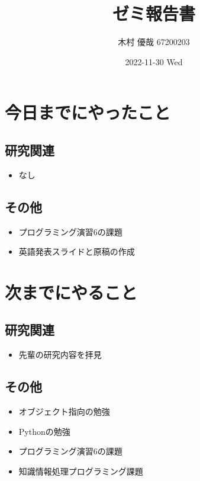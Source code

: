 \documentclass[uplatex, onecolumn, 10pt]{jsarticle}
\begin{document}
\title{\vspace{-40mm}\bf{\LARGE{ゼミ報告書}}}
\author{\vspace{-40mm}木村 優哉 67200203}
\date{2022-11-30 Wed}
\maketitle


\section{今日までにやったこと}

\subsection*{研究関連} 
\begin{itemize}
	\item なし
\end{itemize}

\subsection*{その他}
\begin{itemize}
	\item プログラミング演習6の課題
	\item 英語発表スライドと原稿の作成
\end{itemize}


\section{次までにやること}

\subsection*{研究関連} 
\begin{itemize}
	\item 先輩の研究内容を拝見
\end{itemize}

\subsection*{その他}
\begin{itemize}
	\item オブジェクト指向の勉強
	\item Pythonの勉強
	\item プログラミング演習6の課題
	\item 知識情報処理プログラミング課題
\end{itemize}
\end{document}

